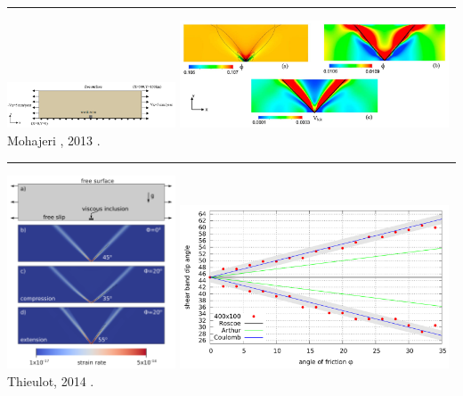 \begin{center}\noindent\rule{12cm}{0.4pt}\end{center}

\begin{center}
\includegraphics[width=5cm]{images/benchmark_brick/mofm13a}
\includegraphics[width=8cm]{images/benchmark_brick/mofm13b}\\
{\captionfont Mohajeri \etal, 2013 \cite{mofm13}.}
\end{center}

\begin{center}\noindent\rule{12cm}{0.4pt}\end{center}

\begin{center}
\includegraphics[width=5cm]{images/benchmark_brick/thie14a}
\includegraphics[width=8cm]{images/benchmark_brick/thie14b}\\
{\captionfont Thieulot, 2014 \cite{thie14}.}
\end{center}

